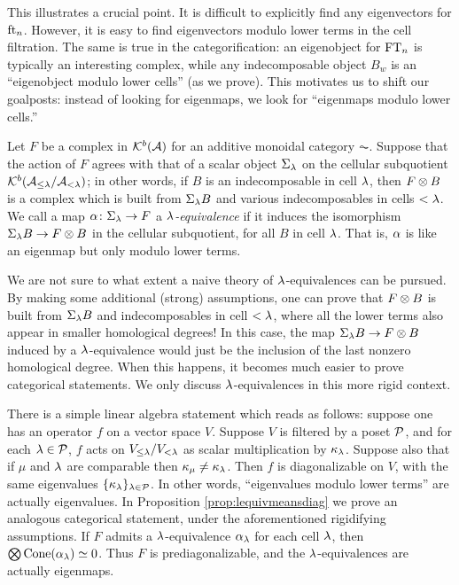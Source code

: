 This illustrates a crucial point. It is difficult to explicitly find any eigenvectors for $\operatorname{ft}_n$. However, it is easy to find eigenvectors modulo lower terms in the cell
filtration. The same is true in the categorification: an eigenobject for $\operatorname{FT}_n$ is typically an interesting complex, while any indecomposable object $B_w$ is an ``eigenobject modulo lower
cells'' (as we prove). This motivates us to shift our goalposts: instead of looking for eigenmaps, we look for ``eigenmaps modulo lower cells.''

Let $F$ be a complex in ${\mathcal{K}}^b({\mathcal{A}})$ for an additive monoidal category $\AC$. Suppose that the action of $F$ agrees with that of a scalar object $\Sigma_\lambda$ on the cellular subquotient
${\mathcal{K}}^b({\mathcal{A}}_{\le \lambda}/{\mathcal{A}}_{< \lambda})$; in other words, if $B$ is an indecomposable in cell $\lambda$, then $F \otimes B$ is a complex which is built from $\Sigma_\lambda B$ and various indecomposables in
cells $< \lambda$. We call a map $\alpha \colon \Sigma_\lambda \rightarrow F$ a \emph{$\lambda$-equivalence} if it induces the isomorphism $\Sigma_\lambda B \rightarrow F \otimes B$ in the cellular subquotient, for all $B$ in cell
$\lambda$. That is, $\alpha$ is like an eigenmap but only modulo lower terms.

We are not sure to what extent a naive theory of $\lambda$-equivalences can be pursued. By making some additional (strong) assumptions, one can prove that $F \otimes B$ is built from $\Sigma_\lambda
B$ and indecomposables in cell $< \lambda$, where all the lower terms also appear in smaller homological degrees! In this case, the map $\Sigma_\lambda B \rightarrow F \otimes B$ induced by a $\lambda$-equivalence
would just be the inclusion of the last nonzero homological degree. When this happens, it becomes much easier to prove categorical statements. We only discuss $\lambda$-equivalences in this
more rigid context.

There is a simple linear algebra statement which reads as follows: suppose one has an operator $f$ on a vector space $V$. Suppose $V$ is filtered by a poset ${\mathcal{P}}$, and for each $\lambda \in
{\mathcal{P}}$, $f$ acts on $V_{\le \lambda} / V_{< \lambda}$ as scalar multiplication by $\kappa_\lambda$. Suppose also that if $\mu$ and $\lambda$ are comparable then $\kappa_{\mu}\neq \kappa_{\lambda}$. Then $f$ is diagonalizable on $V$, with the same eigenvalues $\{\kappa_\lambda\}_{\lambda \in {\mathcal{P}}}$. In other words,
``eigenvalues modulo lower terms'' are actually eigenvalues. In Proposition \ref{prop:lequivmeansdiag} we prove an analogous categorical statement, under the aforementioned rigidifying
assumptions. If $F$ admits a $\lambda$-equivalence $\alpha_\lambda$ for each cell $\lambda$, then $\bigotimes \operatorname{Cone}(\alpha_\lambda) \simeq 0$. Thus $F$ is prediagonalizable, and the $\lambda$-equivalences are actually eigenmaps.

